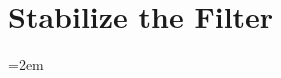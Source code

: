 \documentclass[12pt, fleqn]{article}
\begin{document}
\section{Stabilize the Filter}

\newpage
\appendix

\newpage
{}
\emergencystretch=2em
\nocite{*}
\printbibliography
\end{document}
